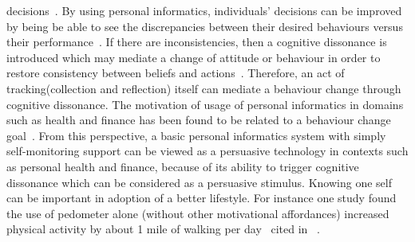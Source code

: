 decisions~\citep{Oinas-kukkonen:psd}. By using personal informatics, individuals' decisions can be improved by being be able to see the discrepancies between their desired behaviours versus their performance~\citep{comber2013designing}. If there are inconsistencies, then a cognitive dissonance is introduced which may mediate a change of attitude or behaviour in order to restore consistency between beliefs and actions~\citep{Oinas-kukkonen:psd}. Therefore, an act of tracking(collection and reflection) itself can mediate a behaviour change through cognitive dissonance. The motivation of usage of personal informatics in domains such as health and finance has been found to be related to a behaviour change goal~\citep{epstein2015lived}. From this perspective, a basic personal informatics system with simply self-monitoring support can be viewed as a persuasive technology in contexts such as personal health and finance, because of its ability to trigger cognitive dissonance which can be considered as a persuasive stimulus. Knowing one self can be important in adoption of a better lifestyle. For instance one study found the use of pedometer alone (without other motivational affordances) increased physical activity by about 1 mile of walking per day~\citep{bravata2007using} cited in ~\cite{albaina2009flowie}.  

